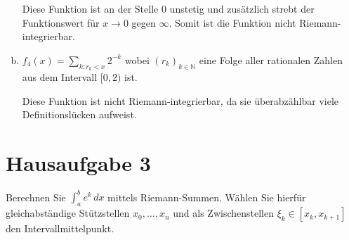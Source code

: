 \documentclass{article}
\begin{document}
\begin{enumerate}[a)]

  Diese Funktion ist an der Stelle $0$ unstetig und zusätzlich strebt der
  Funktionswert für $x \to 0$ gegen $\infty$.
  Somit ist die Funktion nicht Riemann-integrierbar.

\item $f_4(x) = \underset{k \colon r_k < x}{\sum} 2^{-k}$  wobei
  $(r_k)_{k \in \mathbb{N}}$ eine Folge aller rationalen Zahlen aus dem
  Intervall $[0, 2)$ ist.

  Diese Funktion ist nicht Riemann-integrierbar, da sie überabzählbar viele
  Definitionslücken aufweist.
  
\end{enumerate}

\newpage
\section*{Hausaufgabe 3}

Berechnen Sie $\int_a^b e^k \,dx$  mittels Riemann-Summen. Wählen Sie hierfür
gleichabständige Stützstellen $x_0, \ldots, x_n$ und als Zwischenstellen
$\xi_k \in [x_k, x_{k + 1}]$ den Intervallmittelpunkt.
\end{document}
